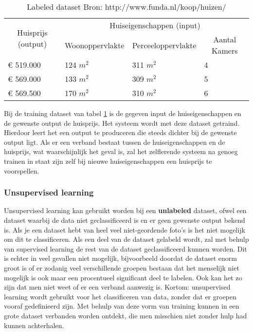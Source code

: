\begin{table}[H]
\centering
\begin{tabular}{llll}
\hline
\multicolumn{1}{c}{\multirow{2}{*}{Huisprijs (output)}} & \multicolumn{3}{c}{Huiseigenschappen (input)} \\
\multicolumn{1}{c}{} & \multicolumn{1}{c}{Woonoppervlakte} & \multicolumn{1}{c}{Perceeloppervlakte} & \multicolumn{1}{c}{Aantal Kamers} \\ \hline
€ 519.000 & 124 $ m^{2} $ & 311 $ m^{2} $ & 4 \\
€ 569.000 & 133 $ m^{2} $ & 309 $ m^{2} $ & 5 \\
€ 569.500 & 170 $ m^{2} $ & 310 $ m^{2} $ & 6 \\ \hline
\end{tabular}
\caption{Labeled dataset Bron: http://www.funda.nl/koop/huizen/ }
\label{fig:LabeledDataset}
\end{table}
Bij de training dataset van tabel \ref{fig:LabeledDataset} is de gegeven input de huiseigenschappen en de gewenste output de huisprijs. Het systeem wordt met deze dataset getraind. Hierdoor leert het een output te produceren die steeds dichter bij de gewenste output ligt. Als er een verband bestaat tussen de huiseigenschappen en de huisprijs, wat waarschijnlijk het geval is, zal het zelflerende systeem na genoeg trainen in staat zijn zelf bij nieuwe huiseigenschappen een huisprijs te voorspellen. \cite{MLCourse1}

\subsubsection{Unsupervised learning}
Unsupervised learning kan gebruikt worden bij een \textbf{unlabeled} dataset, ofwel een dataset waarbij de data niet geclassificeerd is en er geen gewenste output bekend is. Als je een dataset hebt van heel veel niet-geordende foto's is het niet mogelijk om dit te classificeren. Als een deel van de dataset gelabeld wordt, zal met behulp van supervised learning de rest van de dataset geclassificeerd kunnen worden. Dit is echter in veel gevallen niet mogelijk, bijvoorbeeld doordat de dataset enorm groot is of er zodanig veel verschillende groepen bestaan dat het menselijk niet mogelijk is ook maar een procentueel significant deel te labelen. Ook kan het zo zijn dat men niet weet of er een verband aanwezig is. 
Kortom: unsupervised learning wordt gebruikt voor het classificeren van data, zonder dat er groepen vooraf gedefinieerd zijn. Met behulp van deze vorm van training kunnen in een grote dataset verbanden worden ontdekt, die men misschien niet zonder hulp had kunnen achterhalen.  \cite{MLCourse2}

